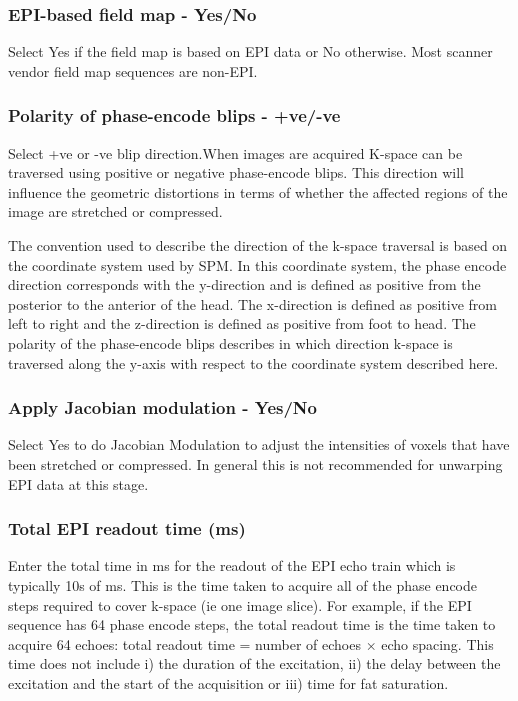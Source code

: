 \subsubsection{EPI-based field map - Yes/No}
Select Yes if the field map is based on EPI data or No otherwise. Most scanner vendor field map sequences are non-EPI.

\subsubsection{Polarity of phase-encode blips - +ve/-ve}
Select +ve or -ve blip direction.When images are acquired K-space can be traversed using positive or negative phase-encode blips. This direction will influence the geometric distortions in terms of whether the affected regions of the image are stretched or compressed. 

The convention used to describe the direction of the k-space traversal is based on the coordinate system used by SPM. In this coordinate system, the phase encode direction corresponds with the y-direction and is defined as positive from the posterior to the anterior of the head. The x-direction is defined as positive from left to right and the z-direction is defined as positive from foot to head. The polarity of the phase-encode blips describes in which direction k-space is traversed along the y-axis with respect to the coordinate system described here. 

\subsubsection{Apply Jacobian modulation - Yes/No}
Select Yes to do Jacobian Modulation to adjust the intensities of voxels that have been stretched or compressed. In general this is not recommended for unwarping EPI data at this stage.

\subsubsection{Total EPI readout time (ms)}
Enter the total time in ms for the readout of the EPI echo train which is typically 10s of ms. This is the time taken to acquire all of the phase encode steps required to cover k-space (ie one image slice). For example, if the EPI sequence has 64 phase encode steps, the total readout time is the time taken to acquire 64 echoes: 
        total readout time = number of echoes $\times$ echo spacing.
This time does not include i) the duration of the excitation, ii) the delay between the excitation and the start of the acquisition or iii) time for fat saturation.

